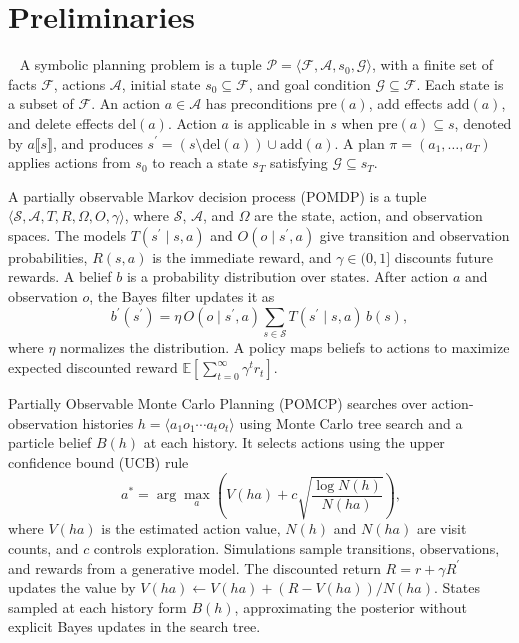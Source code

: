 \section{Preliminaries}~\label{preliminaries}
A symbolic planning problem is a tuple $\mathcal{P}=\langle\mathcal{F},\mathcal{A},s_0,\mathcal{G}\rangle$, with a finite set of facts $\mathcal{F}$, actions $\mathcal{A}$, initial state $s_0\subseteq\mathcal{F}$, and goal condition $\mathcal{G}\subseteq\mathcal{F}$. Each state is a subset of $\mathcal{F}$. An action $a\in\mathcal{A}$ has preconditions $\mathrm{pre}(a)$, add effects $\mathrm{add}(a)$, and delete effects $\mathrm{del}(a)$.
Action $a$ is applicable in $s$ when $\mathrm{pre}(a)\subseteq s$, denoted by $a\llbracket s\rrbracket$, and produces $s^\prime=(s\setminus\mathrm{del}(a))\cup\mathrm{add}(a)$. A plan $\pi=(a_1,\ldots,a_T)$ applies actions from $s_0$ to reach a state $s_T$ satisfying $\mathcal{G}\subseteq s_T$.

A partially observable Markov decision process (POMDP) is a tuple $\langle\mathcal{S},\mathcal{A},T,R,\Omega,O,\gamma\rangle$, where $\mathcal{S}$, $\mathcal{A}$, and $\Omega$ are the state, action, and observation spaces. The models $T(s^\prime\mid s,a)$ and $O(o\mid s^\prime,a)$ give transition and observation probabilities, $R(s,a)$ is the immediate reward, and $\gamma\in(0,1]$ discounts future rewards. A belief $b$ is a probability distribution over states. After action $a$ and observation $o$, the Bayes filter updates it as
\[
b^\prime(s^\prime) = \eta \, O(o \mid s^\prime,a) \sum_{s \in \mathcal{S}} T(s^\prime \mid s,a) \, b(s),
\]
where $\eta$ normalizes the distribution. A policy maps beliefs to actions to maximize expected discounted reward $\mathbb{E}[\sum_{t=0}^{\infty}\gamma^t r_t]$.

Partially Observable Monte Carlo Planning (POMCP) searches over action-observation histories $h=\langle a_1o_1\cdots a_to_t\rangle$ using Monte Carlo tree search and a particle belief $B(h)$ at each history. It selects actions using the upper confidence bound (UCB) rule
\begin{equation}~\label{eq:ucb}
a^* = \arg\max_a \left( V(ha) + c \sqrt{\frac{\log N(h)}{N(ha)}} \right),
\end{equation}
where $V(ha)$ is the estimated action value, $N(h)$ and $N(ha)$ are visit counts, and $c$ controls exploration. Simulations sample transitions, observations, and rewards from a generative model. The discounted return $R=r+\gamma R^\prime$ updates the value by $V(ha)\leftarrow V(ha)+(R-V(ha))/N(ha)$. States sampled at each history form $B(h)$, approximating the posterior without explicit Bayes updates in the search tree.

